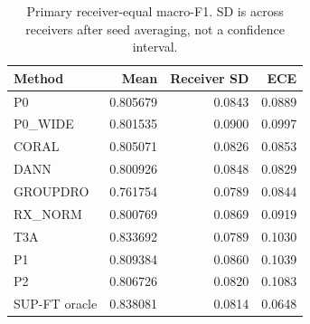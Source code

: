 \begin{table}[t]
\centering
\caption{Primary receiver-equal macro-F1. SD is across receivers after seed averaging, not a confidence interval.}
\label{tab:bench}
\small
\begin{tabular}{lrrr}
\toprule
Method & Mean & Receiver SD & ECE\\
\midrule
P0 & 0.805679 & 0.0843 & 0.0889\\
P0\_WIDE & 0.801535 & 0.0900 & 0.0997\\
CORAL & 0.805071 & 0.0826 & 0.0853\\
DANN & 0.800926 & 0.0848 & 0.0829\\
GROUPDRO & 0.761754 & 0.0789 & 0.0844\\
RX\_NORM & 0.800769 & 0.0869 & 0.0919\\
T3A & 0.833692 & 0.0789 & 0.1030\\
P1 & 0.809384 & 0.0860 & 0.1039\\
P2 & 0.806726 & 0.0820 & 0.1083\\
SUP-FT oracle & 0.838081 & 0.0814 & 0.0648\\
\bottomrule
\end{tabular}
\end{table}
